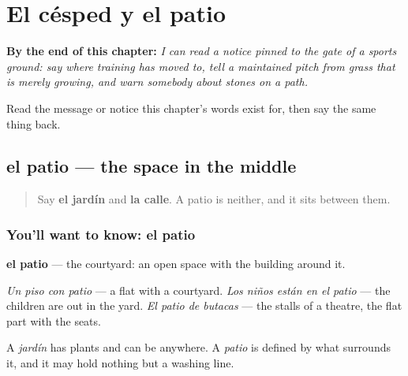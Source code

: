 
\chapter{El césped y el patio}
\label{ch:es-suelo}

\begin{chapteropening}
\textbf{By the end of this chapter:} \emph{I can read a notice pinned to the gate of a sports ground: say where training has moved to, tell a maintained pitch from grass that is merely growing, and warn somebody about stones on a path.}

Read the message or notice this chapter's words exist for, then say the same thing back.
\end{chapteropening}

\section[el patio]{el patio — the space in the middle}

\label{lesson:ES-C450-patio}



\begin{quote}
Say \textbf{el jardín} and \textbf{la calle}. A patio is neither, and it sits between them.
\end{quote}

\subsection*{You'll want to know: el patio}
\textbf{el patio} — the courtyard: an open space with the building around it.

\emph{Un piso con patio} — a flat with a courtyard. \emph{Los niños están en el patio} — the children are out in the yard. \emph{El patio de butacas} — the stalls of a theatre, the flat part with the seats.

A \emph{jardín} has plants and can be anywhere. A \emph{patio} is defined by what surrounds it, and it may hold nothing but a washing line.

